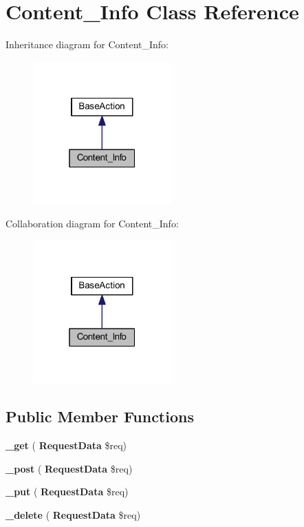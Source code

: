 \section{Content\+\_\+\+Info Class Reference}
\label{class_lora_1_1_content_1_1_content___info}


Inheritance diagram for Content\+\_\+\+Info\+:\nopagebreak
\begin{figure}[H]
\begin{center}
\leavevmode
\includegraphics[width=151pt]{class_lora_1_1_content_1_1_content___info__inherit__graph}
\end{center}
\end{figure}


Collaboration diagram for Content\+\_\+\+Info\+:\nopagebreak
\begin{figure}[H]
\begin{center}
\leavevmode
\includegraphics[width=151pt]{class_lora_1_1_content_1_1_content___info__coll__graph}
\end{center}
\end{figure}
\subsection*{Public Member Functions}
\begin{DoxyCompactItemize}
\item 
\mbox{\label{class_lora_1_1_content_1_1_content___info_a3ad4bf1b146a3180b34d1327ff2abf69}} 
{\bfseries \+\_\+get} (\textbf{ Request\+Data} \$req)
\item 
\mbox{\label{class_lora_1_1_content_1_1_content___info_a50751d47a139282d1c3b08cab1b6562e}} 
{\bfseries \+\_\+post} (\textbf{ Request\+Data} \$req)
\item 
\mbox{\label{class_lora_1_1_content_1_1_content___info_a2affcc8f31c13147c33450193b229194}} 
{\bfseries \+\_\+put} (\textbf{ Request\+Data} \$req)
\item 
\mbox{\label{class_lora_1_1_content_1_1_content___info_ab8ddc6de1e04524212f7d55893f78864}} 
{\bfseries \+\_\+delete} (\textbf{ Request\+Data} \$req)
\end{DoxyCompactItemize}
